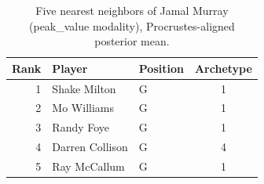 \begin{table}[htbp]
  \centering\small
  \begin{tabular}{rllc}
    \toprule
    Rank & Player & Position & Archetype \\
    \midrule
    1 & Shake Milton & G & 1 \\
    2 & Mo Williams & G & 1 \\
    3 & Randy Foye & G & 1 \\
    4 & Darren Collison & G & 4 \\
    5 & Ray McCallum & G & 1 \\
    \bottomrule
  \end{tabular}
  \caption{Five nearest neighbors of Jamal Murray (peak_value modality), Procrustes-aligned posterior mean.}
  \label{tab:Jamal_Murray_neighbors_peak_value}
\end{table}

